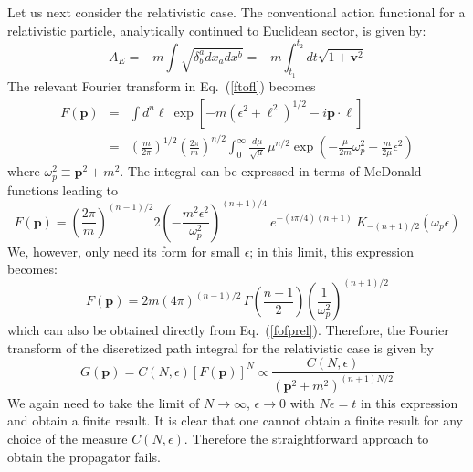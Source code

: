 \documentclass{article}
\def\eq#1{{Eq.~(\ref{#1})}}
\def\frab#1#2{\left(\frac{#1}{#2}\right)}
\begin{document}
Let us next consider the relativistic case. The  conventional action functional for a relativistic particle, analytically continued to Euclidean sector, is given by:
 \begin{equation}
 A_E = - m \int \sqrt{\delta^a_b dx_a dx^b}=- m \int_{t_1}^{t_2} dt \sqrt{1+\bm{v}^2}
\label{sqrtact}
\end{equation} 
The relevant Fourier transform in \eq{ftofl} becomes
\begin{eqnarray}
 F(\bm{p}) &=& \int d^n\bm{\ell}\ \exp[-m(\epsilon^2+\bm{\ell}^2)^{1/2} - i\bm{p\cdot \ell}]\nonumber\\
 &=& \frab{m}{2\pi}^{1/2}\frab{2\pi}{m}^{n/2} \int_0^\infty \frac{d\mu }{\sqrt{\mu }} \, \mu ^{n/2} \exp\left( - \frac{\mu }{2m} \omega_p^2 - \frac{m}{2\mu } \epsilon^2\right)
 \label{fofprel}
\end{eqnarray}
where $\omega_p^2 \equiv \bm{p}^2 + m^2$.
The integral can be expressed in terms of McDonald functions leading to
\begin{equation}
 F(\bm{p}) = \frab{2\pi}{m}^{(n-1)/2} 2 \left(- \frac{m^2 \epsilon^2}{\omega_p^2}\right)^{(n+1)/4} \ e^{-(i\pi/4)(n+1)} \
 K_{-(n+1)/2} (\omega_p\epsilon)
\end{equation}
We, however, only need its form for small $\epsilon$; in this limit, 
 this expression becomes:
\begin{equation}
 F(\bm{p}) = 2m (4\pi)^{(n-1)/2} \, \Gamma\frab{n+1}{2} \frab{1}{\omega_p^2}^{(n+1)/2}
 \label{fofprel1}
\end{equation}
which can also be obtained directly from \eq{fofprel}. 
Therefore, the Fourier transform of the discretized path integral for the relativistic case is given by
\begin{equation}
 G(\bm{p}) = C(N,\epsilon)\left[ F(\bm{p})\right]^{N} \propto \frac{C(N,\epsilon)}{(\bm{p}^2+m^2)^{(n+1)N/2}}
 \label{disaster1}
\end{equation} 
We again need to take the limit of $N\to \infty$, $\epsilon \to 0$ with $N\epsilon = t$  in this expression and obtain a finite result. It is clear that one cannot obtain a finite result for any choice of the measure $C(N,\epsilon)$. Therefore the straightforward approach to obtain the propagator fails. 
\end{document}
